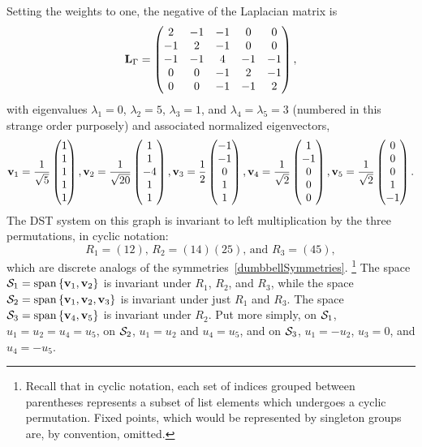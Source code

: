 \documentclass{article}
\numberwithin{equation}{section}
\numberwithin{figure}{section}
\begin{document}
Setting the weights to one, the negative of the Laplacian matrix is
\begin{equation}
\label{bowtieDST}
\mathbf{L}_\Gamma = \begin{pmatrix}
 2 & -1 & -1 & 0 & 0 \\
 -1 & 2 & -1 & 0 & 0 \\
 -1 & -1 & 4 & -1 & -1 \\
 0 & 0 & -1 & 2 & -1 \\
 0 & 0 & -1 & -1 & 2
 \end{pmatrix},
\end{equation}
with eigenvalues $\lambda_1=0$, $\lambda_2=5$, $\lambda_3=1$, and $\lambda_4=\lambda_5=3$
(numbered in this strange order purposely) and associated normalized eigenvectors,
$$
\mathbf{v}_1 = \frac{1}{\sqrt{5}} \begin{pmatrix} 1 \\ 1 \\ 1 \\ 1 \\ 1 \end{pmatrix}, 
\mathbf{v}_2 = \frac{1}{\sqrt{20}} \begin{pmatrix}1 \\ 1 \\ -4 \\ 1 \\ 1 \end{pmatrix},
\mathbf{v}_3 = \frac{1}{2} \begin{pmatrix}-1 \\ -1 \\ 0 \\ 1 \\1 \end{pmatrix},
\mathbf{v}_4 = \frac{1}{\sqrt{2}} \begin{pmatrix}1 \\ -1 \\ 0  \\ 0 \\ 0 \end{pmatrix},
\mathbf{v}_5 = \frac{1}{\sqrt{2}} \begin{pmatrix}0  \\ 0 \\ 0  \\ 1 \\ -1 \end{pmatrix}.
$$
The DST system on this graph is invariant to left multiplication by the three permutations, in cyclic notation:
$$
R_1 = (12), \, R_2 = (14)(25), \, \text{and } R_3 = (45),
$$
which are discrete analogs of the symmetries~\eqref{dumbbellSymmetries}.%
\footnote{Recall that in cyclic notation, each set of indices grouped between parentheses represents a subset of list elements which undergoes a cyclic permutation. Fixed points, which would be represented by singleton groups are, by convention, omitted.}
The space $\mathcal{S}_1 =\operatorname{span}{\{\mathbf{v}_1,\mathbf{v}_2\}}$ is invariant under $R_1$, $R_2$, and $R_3$, while the space $\mathcal{S}_2=\operatorname{span}{\{\mathbf{v}_1,\mathbf{v}_2,\mathbf{v}_3\}}$ is invariant under just $R_1$ and $R_3$. The space $\mathcal{S}_3 =\operatorname{span}{\{\mathbf{v}_4,\mathbf{v}_5\}}$ is invariant under $R_2$. Put more simply, on $\mathcal{S}_1$, $u_1 = u_2 = u_4 = u_5$, on $\mathcal{S}_2$, $u_1 = u_2$ and $u_4 = u_5$, and on $\mathcal{S}_3$, $u_1=-u_2$, $u_3=0$, and $u_4=-u_5$.
 
\end{document}
